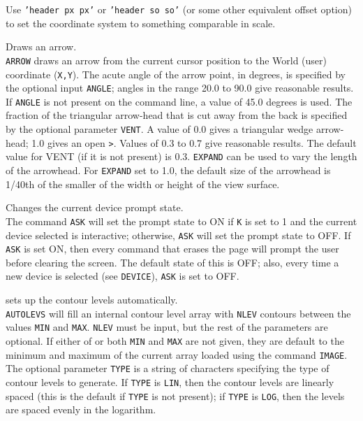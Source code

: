 	Use {\tt 'header px px'} or
	{\tt 'header so so'}
	(or some other equivalent offset option) to set the coordinate
	system to something comparable in scale.
\item [{\tt ARROW X Y [ANGLE [VENT]] } --] Draws an arrow.\\
	{\tt ARROW} draws an arrow from the current cursor
	position to the World (user) coordinate ({\tt X,Y}).
	The acute angle of the arrow point, in degrees, is specified by
	the optional input {\tt ANGLE}; angles in the range
	20.0 to 90.0 give reasonable results.  If {\tt ANGLE} is
	not present on the command line, a value of 45.0 degrees is used.
	The fraction of the triangular arrow-head that is cut away from the
	back is specified by the optional parameter {\tt VENT}.
	A value of 0.0 gives a triangular wedge arrow-head; 1.0 gives
	an open \verb+>+.  Values of 0.3 to 0.7 give reasonable results.  The
	default value for VENT (if it is not present) is 0.3.
	{\tt EXPAND} can be used to vary
	the length of the arrowhead.  For
	{\tt EXPAND} set to 1.0, the default
	size of the arrowhead is 1/40th of the smaller of the width or
	height of the view surface.
\item [{\tt ASK K } --] Changes the current device prompt state.\\
	The command {\tt ASK} will set the prompt state to ON if
	{\tt K} is set to 1 and the current device selected is
	interactive; otherwise, {\tt ASK} will set the prompt
	state to OFF.  If {\tt ASK} is set ON, then every command
	that erases the page will prompt the user before clearing the
	screen.  The default state of this is OFF; also, every time a new
	device is selected (see {\tt DEVICE}),
	{\tt ASK} is set to OFF.
\item [{\tt AUTOLEVS NLEV [TYPE [MIN [MAX]]] } --] sets up the contour levels automatically.\\
	{\tt AUTOLEVS} will fill an internal contour level array
	with {\tt NLEV} contours between the values {\tt MIN}
	and {\tt MAX}.  {\tt NLEV} must be input, but the
	rest of the parameters are optional.  If either of or both
	{\tt MIN} and {\tt MAX} are not given, they are
	default to the minimum and maximum of the current array loaded
	using the command {\tt IMAGE}.  The
	optional parameter {\tt TYPE} is a string of characters
	specifying the type of contour levels to generate.  If
	{\tt TYPE} is {\tt LIN}, then the contour levels
	are linearly spaced (this is the default if {\tt TYPE}
	is not present); if {\tt TYPE} is {\tt LOG}, then
	the levels are spaced evenly in the logarithm.
